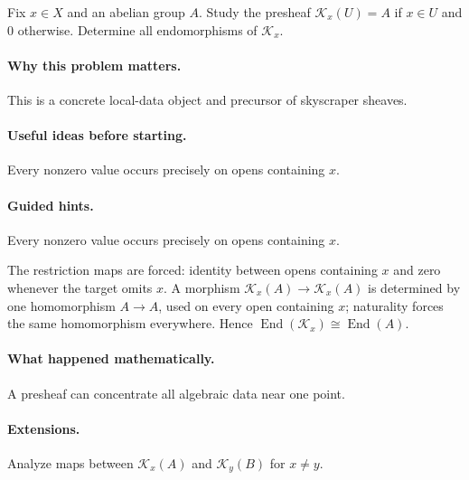 \begin{problem}
Fix $x\in X$ and an abelian group $A$.  Study the presheaf $\mathcal K_x(U)=A$ if $x\in U$ and $0$ otherwise.  Determine all endomorphisms of $\mathcal K_x$.
\end{problem}

\paragraph{Why this problem matters.}
This is a concrete local-data object and precursor of skyscraper sheaves.

\paragraph{Useful ideas before starting.}
Every nonzero value occurs precisely on opens containing $x$.

\paragraph{Guided hints.}
Every nonzero value occurs precisely on opens containing $x$.

\begin{solution}
The restriction maps are forced: identity between opens containing $x$ and zero whenever the target omits $x$.  A morphism $\mathcal K_x(A)\to\mathcal K_x(A)$ is determined by one homomorphism $A\to A$, used on every open containing $x$; naturality forces the same homomorphism everywhere.  Hence $\operatorname{End}(\mathcal K_x)\cong\operatorname{End}(A)$.
\end{solution}

\paragraph{What happened mathematically.}
A presheaf can concentrate all algebraic data near one point.

\paragraph{Extensions.}
Analyze maps between $\mathcal K_x(A)$ and $\mathcal K_y(B)$ for $x\ne y$.
